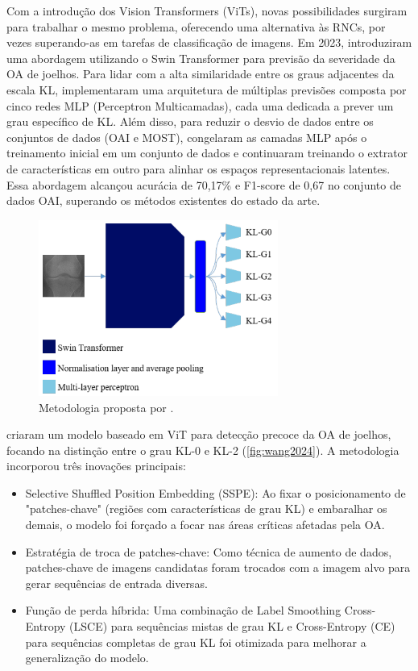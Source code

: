 Com a introdução dos Vision Transformers (ViTs), novas possibilidades surgiram para trabalhar o mesmo problema, oferecendo uma alternativa às RNCs, por vezes superando-as em tarefas de classificação de imagens. Em 2023, \cite{sekhri2023} introduziram uma abordagem utilizando o Swin Transformer para previsão da severidade da OA de joelhos. Para lidar com a alta similaridade entre os graus adjacentes da escala KL, implementaram uma arquitetura de múltiplas previsões composta por cinco redes MLP (Perceptron Multicamadas), cada uma dedicada a prever um grau específico de KL. Além disso, para reduzir o desvio de dados entre os conjuntos de dados (OAI e MOST), congelaram as camadas MLP após o treinamento inicial em um conjunto de dados e continuaram treinando o extrator de características em outro para alinhar os espaços representacionais latentes. Essa abordagem alcançou acurácia de 70,17\% e F1-score de 0,67 no conjunto de dados OAI, superando os métodos existentes do estado da arte.

\begin{figure}[h]
    \centering
    \includegraphics[width=0.7\textwidth]{figs/sekhri2023.png}
    \caption{Metodologia proposta por \cite{sekhri2023}.}
    \label{fig:sekhri2023}
\end{figure}

\cite{Wang_2024} criaram um modelo baseado em ViT para detecção precoce da OA de joelhos, focando na distinção entre o grau KL-0 e KL-2 (\autoref{fig:wang2024}). A metodologia incorporou três inovações principais:

\begin{itemize}
    \item Selective Shuffled Position Embedding (SSPE): Ao fixar o posicionamento de "patches-chave" (regiões com características de grau KL) e embaralhar os demais, o modelo foi forçado a focar nas áreas críticas afetadas pela OA.
    \item Estratégia de troca de patches-chave: Como técnica de aumento de dados, patches-chave de imagens candidatas foram trocados com a imagem alvo para gerar sequências de entrada diversas.
    \item Função de perda híbrida: Uma combinação de Label Smoothing Cross-Entropy (LSCE) para sequências mistas de grau KL e Cross-Entropy (CE) para sequências completas de grau KL foi otimizada para melhorar a generalização do modelo.
\end{itemize}


